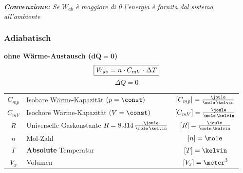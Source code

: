\smallbreak

\textit{\textbf{Convenzione: }Se $W_{ab}$ è maggiore di 0 l'energia è fornita dal sistema all'ambiente}


\subsubsection{Adiabatisch}



\begin{minipage}[c]{0.60\columnwidth}
	\textbf{ohne Wärme-Austausch ($\bm{dQ = 0}$)}
	$$ \boxed{ W_{\rm ab} = n \cdot C_{mV} \cdot \Delta T }  $$
	$$ \boxed{ \Delta Q = 0} $$
\end{minipage}
\hfill
\begin{minipage}[c]{0.35\columnwidth}
	\resizebox{\linewidth}{!}{}
\end{minipage}

\medskip

\renewcommand{\arraystretch}{1.3}
\begin{tabular}{c l c}
	$C_{mp}$ 	& Isobare Wärme-Kapazität $(p = \const)$ 									& $[C_{mp}] = \frac{\joule}{\mole \, \kelvin}$	\\
	$C_{mV}$ 	& Isochore Wärme-Kapazität $(V = \const)$ 									& $[C_{mV}] = \frac{\joule}{\mole \, \kelvin}$	\\
	$R$			& Universelle Gaskonstante $R = 8.314 \, \frac{\joule}{\mole \, \kelvin}$ 	& $[R] = \frac{\joule}{\mole \, \kelvin}$		\\
	$n$ 		& Mol-Zahl 																	& $[n] = \mole$ 								\\
	$T$			& \textbf{Absolute} Temperatur												& $[T] = \kelvin$								\\
	$V_x$		& Volumen																	& $[V_x] = \meter^3$
\end{tabular}
\renewcommand{\arraystretch}{1}

